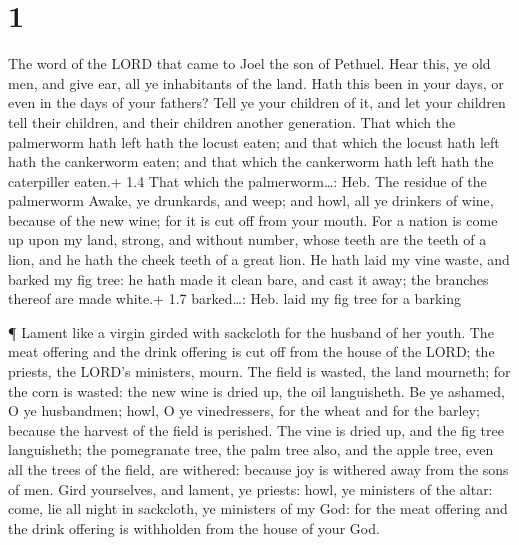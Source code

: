 \hypertarget{section}{%
\section{1}\label{section}}

 The word of the LORD that came to Joel the son of Pethuel.
 Hear this, ye old men, and give ear, all ye inhabitants of
the land. Hath this been in your days, or even in the days of your
fathers?  Tell ye your children of it, and let your children
tell their children, and their children another generation. 
That which the palmerworm hath left hath the locust eaten; and that
which the locust hath left hath the cankerworm eaten; and that which the
cankerworm hath left hath the caterpiller eaten.+ 1.4 That which the
palmerworm\ldots: Heb. The residue of the palmerworm  Awake,
ye drunkards, and weep; and howl, all ye drinkers of wine, because of
the new wine; for it is cut off from your mouth.  For a
nation is come up upon my land, strong, and without number, whose teeth
are the teeth of a lion, and he hath the cheek teeth of a great lion.
 He hath laid my vine waste, and barked my fig tree: he hath
made it clean bare, and cast it away; the branches thereof are made
white.+ 1.7 barked\ldots: Heb. laid my fig tree for a barking

 ¶ Lament like a virgin girded with sackcloth for the
husband of her youth.  The meat offering and the drink
offering is cut off from the house of the LORD; the priests, the LORD's
ministers, mourn.  The field is wasted, the land mourneth;
for the corn is wasted: the new wine is dried up, the oil languisheth.
 Be ye ashamed, O ye husbandmen; howl, O ye vinedressers,
for the wheat and for the barley; because the harvest of the field is
perished.  The vine is dried up, and the fig tree
languisheth; the pomegranate tree, the palm tree also, and the apple
tree, even all the trees of the field, are withered: because joy is
withered away from the sons of men.  Gird yourselves, and
lament, ye priests: howl, ye ministers of the altar: come, lie all night
in sackcloth, ye ministers of my God: for the meat offering and the
drink offering is withholden from the house of your God.

